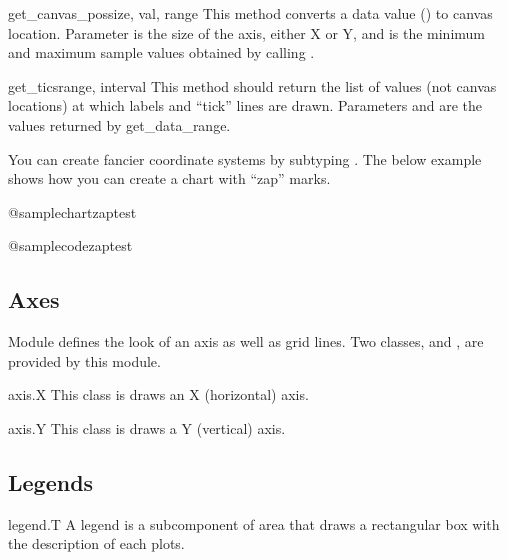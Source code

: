 \documentclass{howto}
\begin{document}
\begin{methoddesc}{get_canvas_pos}{size, val, range}
This method converts a data value () to canvas location.
Parameter  is the size of the
axis, either X or Y, and  is the minimum and maximum sample
values obtained by calling .
\end{methoddesc}

\begin{methoddesc}{get_tics}{range, interval}
This method should return the list of values (not canvas locations) at which
labels and ``tick'' lines are drawn. Parameters  and
 are the
values returned by get_data_range.
\end{methoddesc}

You can create fancier coordinate systems by subtyping .
The below example shows how you can create a chart with ``zap'' marks.

@samplechart{zaptest}

@samplecode{zaptest}

\subsection{Axes}

Module  defines the look of an axis as well as grid
lines. Two classes,  and , are provided by
this module.

\begin{classdesc*}{axis.X}
This class is draws an X (horizontal) axis.

\end{classdesc*}

\begin{classdesc*}{axis.Y}
This class is draws a Y (vertical) axis.

\end{classdesc*}

\subsection{Legends}

\begin{classdesc*}{legend.T}
A legend is a subcomponent of area that draws a rectangular box with
the description of each plots.
\end{classdesc*}
\end{document}

